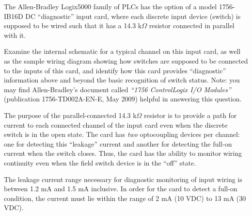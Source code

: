 

The Allen-Bradley Logix5000 family of PLCs has the option of a model 1756-IB16D DC ``diagnostic'' input card, where each discrete input device (switch) is supposed to be wired such that it has a 14.3 k$\Omega$ resistor connected in parallel with it.

\vskip 10pt

Examine the internal schematic for a typical channel on this input card, as well as the sample wiring diagram showing how switches are supposed to be connected to the inputs of this card, and identify how this card provides ``diagnostic'' information above and beyond the basic recognition of switch status.  Note: you may find Allen-Bradley's document called {\it ``1756 ControlLogix I/O Modules''} (publication 1756-TD002A-EN-E, May 2009) helpful in answering this question.







The purpose of the parallel-connected 14.3 k$\Omega$ resistor is to provide a path for current to each connected channel of the input card even when the discrete switch is in the open state.  The card has {\it two} optocoupling devices per channel: one for detecting this ``leakage'' current and another for detecting the full-on current when the switch closes.  Thus, the card has the ability to monitor wiring continuity even when the field switch device is in the ``off'' state.

The leakage current range necessary for diagnostic monitoring of input wiring is between 1.2 mA and 1.5 mA inclusive.  In order for the card to detect a full-on condition, the current must lie within the range of 2 mA (10 VDC) to 13 mA (30 VDC).











